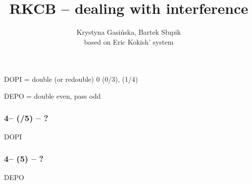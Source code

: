 \documentclass[12pt, a4paper]{article}
\title{RKCB -- dealing with interference}
\author{Krystyna Gasińska, Bartek Słupik\\based on Eric Kokish' system}
\begin{document}
\maketitle

DOPI = double (or redouble) 0 (0/3),  (1/4)

DEPO = double even, pass odd


\subsubsection*{4\nt -- (\dbl/5\minor) -- ?}
DOPI

\subsubsection*{4\nt -- (5\major) -- ?}
DEPO

\end{document}
